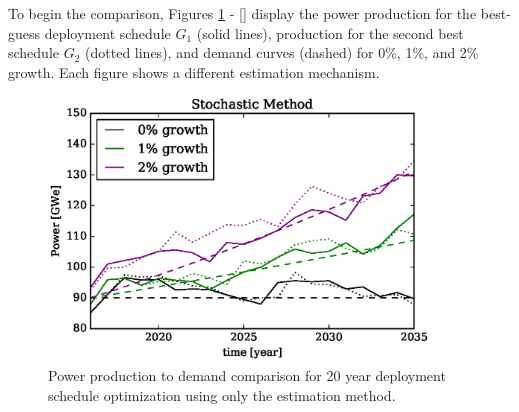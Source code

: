 To begin the comparison, Figures \ref{demand-product-stochastic} - 
\ref{} display the
power production for the best-guess deployment schedule $G_1$ (solid lines),
production for the second best schedule $G_2$ (dotted lines), 
and demand curves (dashed) for 0\%, 1\%, and 2\% growth. 
Each figure shows a different estimation mechanism.

\begin{figure}[htb]
\centering
\includegraphics[width=0.9\textwidth]{demand-product-stochastic.eps}
\caption{Power production to demand comparison for 20 year deployment 
schedule optimization using only the \stochastic estimation method.}
\label{demand-product-stochastic}
\end{figure}

